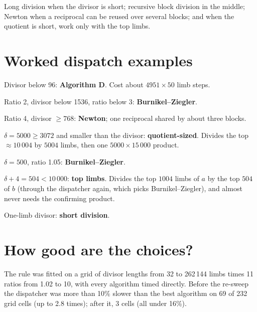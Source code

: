 \begin{keyidea}
Long division when the divisor is short; recursive block division in the middle; Newton when
a reciprocal can be reused over several blocks; and when the quotient is short, work only
with the top limbs.
\end{keyidea}

\section{Worked dispatch examples}

\begin{example}
\begin{description}[leftmargin=1.2cm,style=nextline]
  \item[$5000 \div 50$ limbs] Divisor below 96: \textbf{Algorithm D}. Cost about
        $4951 \times 50$ limb steps.
  \item[$2000 \div 1000$] Ratio 2, divisor below 1536, ratio below 3:
        \textbf{Burnikel--Ziegler}.
  \item[$4000 \div 1000$] Ratio 4, divisor $\ge 768$: \textbf{Newton}; one reciprocal shared
        by about three blocks.
  \item[$20\,000 \div 15\,000$, with remainder] $\delta = 5000 \ge 3072$ and smaller than the
        divisor: \textbf{quotient-sized}. Divides the top $\approx 10\,004$ by $5004$ limbs,
        then one $5000 \times 15\,000$ product.
  \item[$10\,500 \div 10\,000$, with remainder] $\delta = 500$, ratio 1.05:
        \textbf{Burnikel--Ziegler}.
  \item[$10\,500 \div 10\,000$, quotient only] $\delta + 4 = 504 < 10\,000$:
        \textbf{top limbs}. Divides the top $1004$ limbs of $a$ by the top $504$ of $b$ (through
        the dispatcher again, which picks Burnikel--Ziegler), and almost never needs the
        confirming product.
  \item[$a \div 7$] One-limb divisor: \textbf{short division}.
\end{description}
\end{example}

\section{How good are the choices?}

The rule was fitted on a grid of divisor lengths from 32 to 262\,144 limbs times
11 ratios from 1.02 to 10, with every algorithm timed directly. Before the re-sweep the
dispatcher was more than 10\% slower than the best algorithm on 69 of 232 grid cells (up to
2.8 times); after it, 3 cells (all under 16\%).

